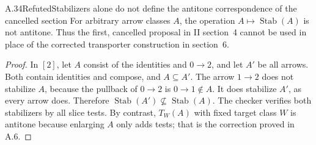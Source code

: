 \begin{claim}{A.34}{Refuted}{Stabilizers alone do not define the antitone correspondence of the cancelled section}
For arbitrary arrow classes $A$, the operation $A\mapsto\operatorname{Stab}(A)$ is not antitone. Thus the first, cancelled proposal in II section~4 cannot be used in place of the corrected transporter construction in section~6.
\end{claim}
\begin{proof}
In $[2]$, let $A$ consist of the identities and $0\to2$, and let $A'$ be all arrows. Both contain identities and compose, and $A\subseteq A'$. The arrow $1\to2$ does not stabilize $A$, because the pullback of $0\to2$ is $0\to1\notin A$. It does stabilize $A'$, as every arrow does. Therefore $\operatorname{Stab}(A')\nsubseteq\operatorname{Stab}(A)$. The checker verifies both stabilizers by all slice tests. By contrast, $T_W(A)$ with fixed target class $W$ is antitone because enlarging $A$ only adds tests; that is the correction proved in A.6.
\end{proof}
